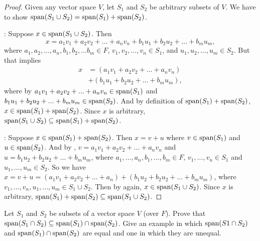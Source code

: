 \begin{proof}
Given any vector space \(V\), let \(S_1\) and \(S_2\) be arbitrary subsets of \(V\).
We have to show \(\operatorname{span}(S_1 \cup S_2) = \operatorname{span}(S_1) + \operatorname{span}(S_2)\).

:
Suppose \(x \in \operatorname{span}(S_1 \cup S_2)\).
Then
\[
    x = a_1 v_1 + a_2 v_2 + ... + a_n v_n + b_1 u_1 + b_2 u_2 + ... + b_m u_m,
\]
where \(a_1, a_2, ..., a_n, b_1, b_2, ... b_m \in F\), \(v_1, v_2, ..., v_n \in S_1\), and \(u_1, u_2, ..., u_m \in S_2\).
But that implies
\begin{align*}
    x & = (a_1 v_1 + a_2 v_2 + ... + a_n v_n) \\
      & + (b_1 u_1 + b_2 u_2 + ... + b_m u_m),
\end{align*}
where by  \(a_1 v_1 + a_2 v_2 + ... + a_n v_n \in \operatorname{span}(S_1)\) and \(b_1 u_1 + b_2 u_2 + ... + b_m u_m \in \operatorname{span}(S_2)\).
And by definition of \(\operatorname{span}(S_1) + \operatorname{span}(S_2)\), \(x \in \operatorname{span}(S_1) + \operatorname{span}(S_2)\).
Since \(x\) is arbitrary, \(\operatorname{span}(S_1 \cup S_2) \subseteq \operatorname{span}(S_1) + \operatorname{span}(S_2)\).

:
Suppose \(x \in \operatorname{span}(S_1) + \operatorname{span}(S_2)\).
Then \(x = v + u\) where \(v \in \operatorname{span}(S_1)\) and \(u \in \operatorname{span}(S_2)\).
And by , \(v = a_1 v_1 + a_2 v_2 + ... + a_n v_n\) and \(u = b_1 u_2 + b_2 u_2 + ... + b_m u_m\), where \(a_1, ..., a_n, b_1, ..., b_m \in F\), \(v_1, ..., v_n \in S_1\) and \(u_1, ..., u_m \in S_2\).
So we have \(x = v + u = (a_1 v_1 + a_2 v_2 + ... + a_n) + (b_1 u_2 + b_2 u_2 + ... + b_m u_m)\), where \(v_1, ..., v_n, u_1, ..., u_m \in S_1 \cup S_2\).
Then by  again, \(x \in \operatorname{span}(S_1 \cup S_2)\).
Since \(x\) is arbitrary, \(\operatorname{span}(S_1) + \operatorname{span}(S_2) \subseteq \operatorname{span}(S_1 \cup S_2)\).
\end{proof}

\begin{exercise} \label{exercise 1.4.15}
Let \(S_1\) and \(S_2\) be subsets of a vector space \(V\) (over \(F\)).
Prove that \(\operatorname{span}(S_1 \cap S_2) \subseteq \operatorname{span}(S_1) \cap \operatorname{span}(S_2)\).
Give an example in which \(\operatorname{span}(S1 \cap S_2)\) and
\(\operatorname{span}(S_1) \cap \operatorname{span}(S_2)\) are equal and one in which they are unequal.
\end{exercise}

